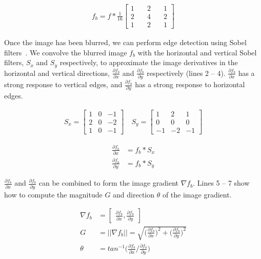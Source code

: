 \documentclass{article}
\begin{document}
\begin{align}
f_b = f * \frac{1}{16} \begin{bmatrix} 
1 & \quad 2 & \quad 1 \\ 
2 & \quad 4 & \quad 2 \\ 
1 & \quad 2 & \quad 1  
\end{bmatrix}
\end{align}

Once the image has been blurred, we can perform edge detection using Sobel filters~\cite{sobel}. We convolve the blurred image $f_b$ with the horizontal and vertical Sobel filters, $S_x$ and $S_y$ respectively, to approximate the image derivatives in the horizontal and vertical directions, $\frac{\partial f_b}{\partial x}$ and $\frac{\partial f_b}{\partial y}$ respectively (lines 2 -- 4). $\frac{\partial f_b}{\partial x}$ has a strong response to vertical edges, and $\frac{\partial f_b}{\partial y}$ has a strong response to horizontal edges.

\begin{align}
S_x = \begin{bmatrix} 
1 & 0 & -1 \\ 
2 & 0 & -2 \\ 
1 & 0 & -1  
\end{bmatrix}
\quad S_y = \begin{bmatrix} 
1 &  2 & 1 \\ 
0 &  0 & 0 \\ 
-1 & -2 & -1  
\end{bmatrix}
\end{align}

\begin{align}
\frac{\partial f_b}{\partial x} &= f_b * S_x \\
\frac{\partial f_b}{\partial y} &= f_b * S_y
\end{align}

$\frac{\partial f_b}{\partial x}$ and $\frac{\partial f_b}{\partial y}$ can be combined to form the image gradient $\nabla f_b$. Lines 5 -- 7 show how to compute the magnitude $G$ and direction $\theta$ of the image gradient.

\begin{align}
\nabla f_b &= \begin{bmatrix} \frac{\partial f_b}{\partial x}, \frac{\partial f_b}{\partial y} \end{bmatrix} \\
G &= \vert \vert \nabla f_b \vert \vert = \sqrt{\Big( \frac{\partial f_b}{\partial x} \Big)^2 + \Big( \frac{\partial f_b}{\partial y} \Big)^2} \\
\theta &= tan^{-1} \Big(\frac{\partial f_b}{\partial x} / \frac{\partial f_b}{\partial y}\Big)
\end{align}
\end{document}
